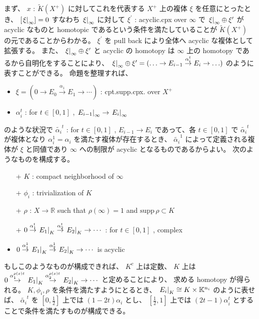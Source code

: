 \documentclass[dvipdfmx]{jsarticle}
\begin{document}
\begin{Proof}
  \itemprof
  まず、 \(x\) : \(\tilde{K}(X^+)\) に対してこれを代表する \(X^+\) 上の複体 \(\xi\) を任意にとったとき、 \([\left. {\xi} \right| _{\infty}] = 0\) すなわち \(\left. {\xi} \right| _{\infty}\) に対して \(\xi^\prime\) : acyclic.cpx over \(\infty\) で \(\left. {\xi} \right| _{\infty} \oplus \xi^\prime\) が acyclic なものと homotopic であるという条件を満たしていることが \(\tilde{K}(X^+)\) の元であることからわかる。
  \(\xi ^\prime\) を pull back により全体へ acyclic な複体として拡張する。
  また、 \(\left. {\xi} \right| _{\infty} \oplus \xi^\prime\) と acyclic の homotopy は \(\infty\) 上の homotopy であるから自明化をすることにより、 \(\left. {\xi} \right| _{\infty} \oplus \xi^\prime = (\ldots \to E_{i-1} \overset{\alpha_i^t}{\to} E_i \to \ldots)\) のように表すことができる。
  命題を整理すれば、
  \begin{itemize}
    \item \(\xi = (0 \to E_0 \overset{\alpha_1}{\to} E_1 \to \cdots)\) : cpt.supp.cpx. over \(X^+\)
    \item \(\alpha_i^t\) : for \(t \in [0,1]\) , \(\left. {E_{i-1}} \right| _{\infty} \to \left. {E_{i}} \right| _{\infty}\)
  \end{itemize}
  のような状況で \(\tilde{\alpha_i}^t\) : for \(t \in [0,1]\) , \(E_{i-1} \to E_{i}\) であって、各 \(t \in [0,1]\) で \(\tilde{\alpha_i}^t\) が複体となり \(\alpha_i^1 = \alpha_i\) を満たす複体が存在するとき、 \(\tilde{\alpha_i}^1\) によって定義される複体が \(\xi\) と同値であり \(\infty\) への制限が acyclic となるものであるからよい。
  次のようなものを構成する。
  \begin{itemize}
    \item[+] \(K\) : compact neighborhood of \(\infty\)
    \item[+] \(\phi_i\) : trivialization of \(K\)
    \item[+] \(\rho\) : \(X \to \mathbb{R}\) such that \(\rho(\infty) = 1\) and \(\text{supp} \, \rho \subset K\)
    \item[+] \(0 \overset{\alpha_1^t}{\to} \left. {E_1} \right| _{K} \overset{\alpha_2^t}{\to} \left. {E_2} \right| _{K} \to \cdots\) : for \(t \in [0,1]\) , complex
    \item \(0 \overset{\alpha_1^1}{\to} \left. {E_1} \right| _{K} \overset{\alpha_2^1}{\to} \left. {E_2} \right| _{K} \to \cdots\) is acyclic
  \end{itemize}
  もしこのようなものが構成できれば、 \(K^c\) 上は定数、 \(K\) 上は \(0 \overset{\alpha_1^{\rho(x)t}}{\to} \left. {E_1} \right| _{K} \overset{\alpha_2^{\rho(x)t}}{\to} \left. {E_2} \right| _{K} \to \cdots\) と定めることにより、 求める homotopy が得られる。
  \(K , \phi_i , \rho\) を条件を満たすようにとるとき、 \(\left. {E_i} \right| _{K} \cong K \times \mathbb{K}^{n_i}\) のように表せば、 \(\tilde{\alpha_i}^t\) を \([0,\frac{1}{2}]\) 上では \((1-2t) \alpha_i\) とし、 \([\frac{1}{2},1]\) 上では \((2t-1) \alpha_i^t\) とすることで条件を満たすものが構成できる。 
\end{Proof}
\end{document}
